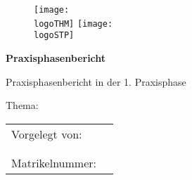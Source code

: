 
\thispagestyle{plain}
\begin{titlepage}



\begin{addmargin}[-0.5cm]{0cm}
\thispagestyle{empty} %

\begin{figure}[h]
  \centering
  		\texttt{[image: \\logoTHM]}
  		\hfill
  		\texttt{[image: \\logoSTP]}
\end{figure}
		
	\begin{center}	
	
			\vspace{15mm}		
			\large
			\textbf{Praxisphasenbericht}
			\large
			
			Praxisphasenbericht in der 1. Praxisphase
	\end{center}

			\vspace{1.0cm}
			

			Thema:

	\begin{center}
    
			\large
			
			\titelDeckblatt
			
			\large
			
			\normalsize


			\vspace{10mm}
									
			\small
			
				\end{center}
			
			\begin{tabular}[h]{ll}
  				Vorgelegt von: 	&	\autor	\\
  								&	\autorStrasse	\\
  								&	\autorOrt	\\
  				Matrikelnummer: &  	\matrikelnr	\\


\end{tabular}
\end{addmargin}
\end{titlepage}
